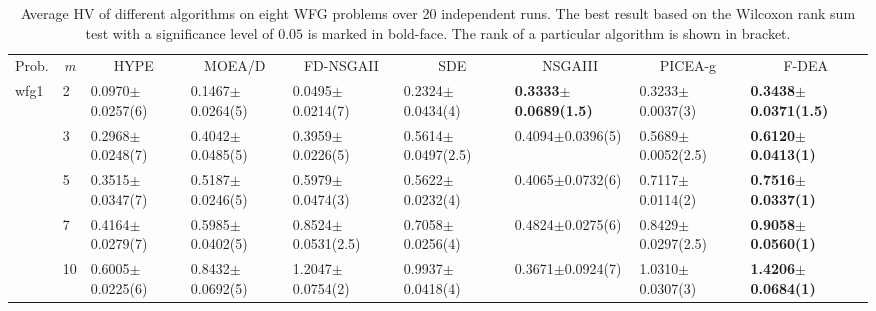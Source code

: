 \begin{table*}[]
\centering
\caption{Average HV of different algorithms on eight WFG problems over 20 independent runs. The best result based on the Wilcoxon rank sum test with a significance level of $0.05$ is marked in bold-face. The rank of a particular algorithm is shown in bracket.}
\label{table:hypewfg1}
\renewcommand{\arraystretch}{1.1}
\begin{adjustbox}{width=1.0\textwidth,center}
\begin{tabular}{lllllllll}
\thickhline
Prob. & \multicolumn{1}{c}{\textit{m}} & \multicolumn{1}{c}{HYPE} & \multicolumn{1}{c}{MOEA/D} & \multicolumn{1}{c}{FD-NSGAII} & \multicolumn{1}{c}{SDE}                       & \multicolumn{1}{c}{NSGAIII}          & \multicolumn{1}{c}{PICEA-g}            & \multicolumn{1}{c}{F-DEA}   \\\thickhline
wfg1  & 2                              & 0.0970$\pm$0.0257(6)         & 0.1467$\pm$0.0264(5)          & 0.0495$\pm$0.0214(7)              & 0.2324$\pm$0.0434(4)                              & \textbf{0.3333$\pm$0.0689(1.5)}          & 0.3233$\pm$0.0037(3)                       & \textbf{0.3438$\pm$0.0371(1.5)} \\
      & 3                              & 0.2968$\pm$0.0248(7)         & 0.4042$\pm$0.0485(5)          & 0.3959$\pm$0.0226(5)              & 0.5614$\pm$0.0497(2.5)                            & 0.4094$\pm$0.0396(5)                     & 0.5689$\pm$0.0052(2.5)                     & \textbf{0.6120$\pm$0.0413(1)}   \\
      & 5                              & 0.3515$\pm$0.0347(7)         & 0.5187$\pm$0.0246(5)          & 0.5979$\pm$0.0474(3)              & 0.5622$\pm$0.0232(4)                              & 0.4065$\pm$0.0732(6)                     & 0.7117$\pm$0.0114(2)                       & \textbf{0.7516$\pm$0.0337(1)}   \\
      & 7                              & 0.4164$\pm$0.0279(7)         & 0.5985$\pm$0.0402(5)          & 0.8524$\pm$0.0531(2.5)            & 0.7058$\pm$0.0256(4)                              & 0.4824$\pm$0.0275(6)                     & 0.8429$\pm$0.0297(2.5)                     & \textbf{0.9058$\pm$0.0560(1)}   \\
      & 10                             & 0.6005$\pm$0.0225(6)         & 0.8432$\pm$0.0692(5)          & 1.2047$\pm$0.0754(2)              & 0.9937$\pm$0.0418(4)                              & 0.3671$\pm$0.0924(7)                     & 1.0310$\pm$0.0307(3)                       & \textbf{1.4206$\pm$0.0684(1)}   \\

\end{tabular}
\end{adjustbox}
\end{table*}
